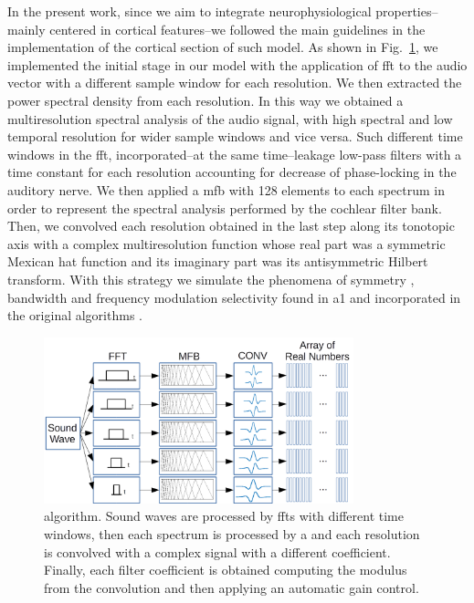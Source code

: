 {In the present work, since we aim to integrate neurophysiological
properties--mainly centered in cortical features--we followed the main guidelines in the implementation of the cortical section of such model. 
As shown in Fig.~\ref{fig:MRSTSA}, we implemented the initial stage in our model with the application of \gls{fft} to the audio vector
with a different sample window for each resolution.
We then extracted the power spectral density from each resolution.
In this way we obtained a multiresolution spectral analysis of the audio signal,
with high spectral and low temporal resolution for wider sample windows and
vice versa.
Such different time windows in the \gls{fft},
incorporated--at the same time--leakage low-pass filters with a time constant for each
resolution accounting for decrease of phase-locking in the auditory nerve.
We then applied a \gls{mfb} with 128 elements to each spectrum
in order to represent the spectral analysis performed by the cochlear filter bank.
Then, we convolved each resolution obtained in the last step along its tonotopic axis
with a complex multiresolution function whose real part
was a symmetric Mexican hat function and its imaginary part was its antisymmetric Hilbert transform.
With this strategy we simulate the phenomena of symmetry \cite{shamma_1993}, bandwidth \cite{schreiner_1990}
and frequency modulation selectivity \cite{shamma_1993,heil_1992,mendelson_1985}
found in \gls{a1} and incorporated in the original algorithms \cite{wang_1995}.

\begin{figure}[h!]
    \centering
    \includegraphics[width=0.8\textwidth]{MRSTSA.png}
    \caption{ algorithm. Sound waves are processed by \glspl{fft} with different time windows, then each spectrum is processed by
    a  and each resolution is convolved with a complex signal with a different coefficient. Finally, each filter coefficient
    is obtained computing the modulus from the convolution and then applying an automatic gain control.}
    \label{fig:MRSTSA}
\end{figure}

}
